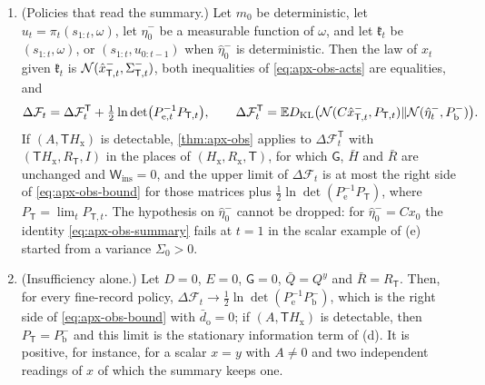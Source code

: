 \begin{proposition}
\begin{enumerate}
\begin{equation}\label{eq:apx-obs-acts}
\mathsf V_t\preceq P_{\mathsf T,t}-P_{\mathrm e,t},\qquad I_t\le\tfrac12\ln\det\bigl(P_{\mathrm e,t}^{-1}P_{\mathsf T,t}\bigr).
\end{equation}
\item[(d)] (Policies that read the summary.) Let $m_0$ be deterministic, let $u_t=\pi_t(s_{1:t},\omega)$, let $\hat\eta^-_0$ be a measurable function of $\omega$, and let $\mathfrak k_t$ be $(s_{1:t},\omega)$, or $(s_{1:t},u_{0:t-1})$ when $\hat\eta^-_0$ is deterministic. Then the law of $x_t$ given $\mathfrak k_t$ is $\mathcal{N}(\hat x^-_{\mathsf T,t},\Sigma^-_{\mathsf T,t})$, both inequalities of \eqref{eq:apx-obs-acts} are equalities, and
\begin{equation}\label{eq:apx-obs-summary}
\Delta\mathcal F_t=\Delta\mathcal F^{\mathsf T}_t+\tfrac12\ln\det\bigl(P_{\mathrm e,t}^{-1}P_{\mathsf T,t}\bigr),\qquad\Delta\mathcal F^{\mathsf T}_t=\mathbb{E}D_{\mathrm{KL}}\bigl(\mathcal{N}(C\hat x^-_{\mathsf T,t},P_{\mathsf T,t})\Vert\mathcal{N}(\hat\eta^-_t,P^-_{\mathrm b})\bigr).
\end{equation}
If $(A,\mathsf TH_{\mathrm x})$ is detectable, \cref{thm:apx-obs} applies to $\Delta\mathcal F^{\mathsf T}_t$ with $(\mathsf TH_{\mathrm x},R_{\mathsf T},I)$ in the places of $(H_{\mathrm x},R_{\mathrm x},\mathsf T)$, for which $\mathsf G$, $\bar H$ and $\bar R$ are unchanged and $\mathsf W_{\mathrm{ins}}=0$, and the upper limit of $\Delta\mathcal F_t$ is at most the right side of \eqref{eq:apx-obs-bound} for those matrices plus $\frac12\ln\det(P_{\mathrm e}^{-1}P_{\mathsf T})$, where $P_{\mathsf T}=\lim_tP_{\mathsf T,t}$. The hypothesis on $\hat\eta^-_0$ cannot be dropped: for $\hat\eta^-_0=Cx_0$ the identity \eqref{eq:apx-obs-summary} fails at $t=1$ in the scalar example of (e) started from a variance $\Sigma_0>0$.
\item[(e)] (Insufficiency alone.) Let $D=0$, $E=0$, $\mathsf G=0$, $\bar Q=Q^y$ and $\bar R=R_{\mathsf T}$. Then, for every fine-record policy, $\Delta\mathcal F_t\to\frac12\ln\det(P_{\mathrm e}^{-1}P^-_{\mathrm b})$, which is the right side of \eqref{eq:apx-obs-bound} with $\bar d_{\mathrm o}=0$; if $(A,\mathsf TH_{\mathrm x})$ is detectable, then $P_{\mathsf T}=P^-_{\mathrm b}$ and this limit is the stationary information term of (d). It is positive, for instance, for a scalar $x=y$ with $A\ne0$ and two independent readings of $x$ of which the summary keeps one.
\end{enumerate}
\end{proposition}

